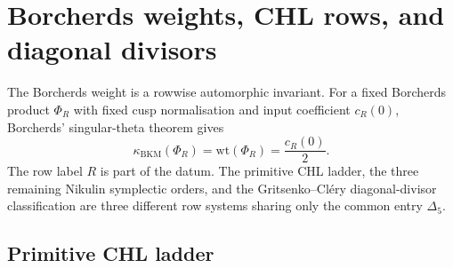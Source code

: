 \providecommand{\kBKM}{\kappa_{\mathrm{BKM}}}
\providecommand{\kch}{\kappa_{\mathrm{ch}}}
\providecommand{\kcat}{\kappa_{\mathrm{cat}}}
\providecommand{\kfib}{\kappa_{\mathrm{fiber}}}
\providecommand{\Z}{\mathbb{Z}}
\providecommand{\Sp}{\mathrm{Sp}}
\providecommand{\DT}{\mathrm{DT}}
\providecommand{\BKM}{\mathrm{BKM}}
\providecommand{\CoHA}{\mathrm{CoHA}}
\providecommand{\Yplus}{Y^+}
\providecommand{\Eone}{E_1}
\providecommand{\Etwo}{E_2}
\providecommand{\Woneinfty}{\mathcal W_{1+\infty}}
\providecommand{\Delfnm}[2]{\Delta_{#1}^{(#2)}}

\section*{Borcherds weights, CHL rows, and diagonal divisors}
\label{sec:borcherds-weight-catalogues}

The Borcherds weight is a rowwise automorphic invariant.  For a fixed
Borcherds product $\Phi_R$ with fixed cusp normalisation and input
coefficient $c_R(0)$, Borcherds' singular-theta theorem gives
\[
  \kBKM(\Phi_R)=\mathrm{wt}(\Phi_R)=\frac{c_R(0)}{2}.
\]
The row label $R$ is part of the datum.  The primitive CHL ladder, the
three remaining Nikulin symplectic orders, and the Gritsenko--Cl\'ery
diagonal-divisor classification are three different row systems sharing
only the common entry $\Delta_5$.

\subsection*{Primitive CHL ladder}

